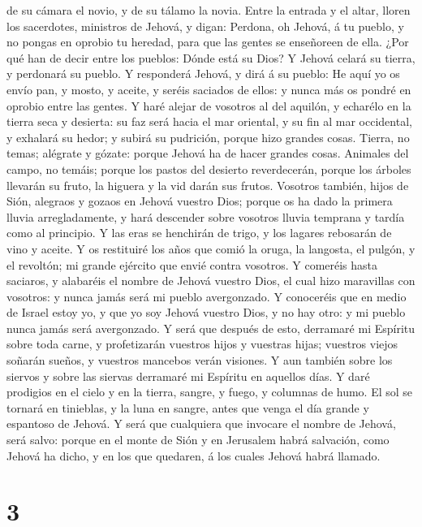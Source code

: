de su cámara el novio, y de su tálamo la novia.  Entre la
entrada y el altar, lloren los sacerdotes, ministros de Jehová, y digan:
Perdona, oh Jehová, á tu pueblo, y no pongas en oprobio tu heredad, para
que las gentes se enseñoreen de ella. ¿Por qué han de decir entre los
pueblos: Dónde está su Dios?  Y Jehová celará su tierra, y
perdonará su pueblo.  Y responderá Jehová, y dirá á su
pueblo: He aquí yo os envío pan, y mosto, y aceite, y seréis saciados de
ellos: y nunca más os pondré en oprobio entre las gentes. 
Y haré alejar de vosotros al del aquilón, y echarélo en la tierra seca y
desierta: su faz será hacia el mar oriental, y su fin al mar occidental,
y exhalará su hedor; y subirá su pudrición, porque hizo grandes cosas.
 Tierra, no temas; alégrate y gózate: porque Jehová ha de
hacer grandes cosas.  Animales del campo, no temáis; porque
los pastos del desierto reverdecerán, porque los árboles llevarán su
fruto, la higuera y la vid darán sus frutos.  Vosotros
también, hijos de Sión, alegraos y gozaos en Jehová vuestro Dios; porque
os ha dado la primera lluvia arregladamente, y hará descender sobre
vosotros lluvia temprana y tardía como al principio.  Y las
eras se henchirán de trigo, y los lagares rebosarán de vino y aceite.
 Y os restituiré los años que comió la oruga, la langosta,
el pulgón, y el revoltón; mi grande ejército que envié contra vosotros.
 Y comeréis hasta saciaros, y alabaréis el nombre de Jehová
vuestro Dios, el cual hizo maravillas con vosotros: y nunca jamás será
mi pueblo avergonzado.  Y conoceréis que en medio de Israel
estoy yo, y que yo soy Jehová vuestro Dios, y no hay otro: y mi pueblo
nunca jamás será avergonzado.  Y será que después de esto,
derramaré mi Espíritu sobre toda carne, y profetizarán vuestros hijos y
vuestras hijas; vuestros viejos soñarán sueños, y vuestros mancebos
verán visiones.  Y aun también sobre los siervos y sobre
las siervas derramaré mi Espíritu en aquellos días.  Y daré
prodigios en el cielo y en la tierra, sangre, y fuego, y columnas de
humo.  El sol se tornará en tinieblas, y la luna en sangre,
antes que venga el día grande y espantoso de Jehová.  Y
será que cualquiera que invocare el nombre de Jehová, será salvo: porque
en el monte de Sión y en Jerusalem habrá salvación, como Jehová ha
dicho, y en los que quedaren, á los cuales Jehová habrá llamado.

\hypertarget{section-2}{%
\section{3}\label{section-2}}

